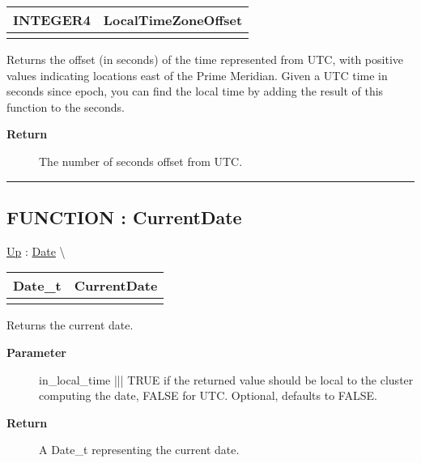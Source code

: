{\renewcommand{\arraystretch}{1.5}
\begin{tabularx}{\textwidth}{|>{\raggedright\arraybackslash}l|X|}
\hline
\hspace{0pt}INTEGER4 & LocalTimeZoneOffset \\
\hline
\multicolumn{2}{|>{\raggedright\arraybackslash}X|}{\hspace{0pt}()} \\
\hline
\end{tabularx}
}

\par
Returns the offset (in seconds) of the time represented from UTC, with positive values indicating locations east of the Prime Meridian. Given a UTC time in seconds since epoch, you can find the local time by adding the result of this function to the seconds.

\par
\begin{description}
\item [\textbf{Return}] The number of seconds offset from UTC.
\end{description}

\rule{\linewidth}{0.5pt}
\subsection*{FUNCTION : CurrentDate}
\hypertarget{ecldoc:date.currentdate}{}
\hyperlink{ecldoc:Date}{Up} :
\hspace{0pt} \hyperlink{ecldoc:Date}{Date} \textbackslash 

{\renewcommand{\arraystretch}{1.5}
\begin{tabularx}{\textwidth}{|>{\raggedright\arraybackslash}l|X|}
\hline
\hspace{0pt}Date\_t & CurrentDate \\
\hline
\multicolumn{2}{|>{\raggedright\arraybackslash}X|}{\hspace{0pt}(BOOLEAN in\_local\_time = FALSE)} \\
\hline
\end{tabularx}
}

\par
Returns the current date.

\par
\begin{description}
\item [\textbf{Parameter}] in\_local\_time ||| TRUE if the returned value should be local to the cluster computing the date, FALSE for UTC. Optional, defaults to FALSE.
\item [\textbf{Return}] A Date\_t representing the current date.
\end{description}

